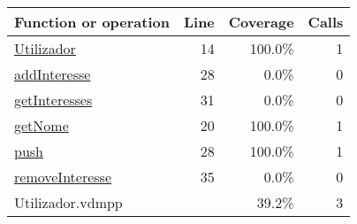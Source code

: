 \begin{longtable}{|l|r|r|r|}
\hline
Function or operation & Line & Coverage & Calls \\
\hline
\hline
\hyperref[Utilizador:14]{Utilizador} & 14&100.0\% & 1 \\
\hline
\hyperref[addInteresse:28]{addInteresse} & 28&0.0\% & 0 \\
\hline
\hyperref[getInteresses:31]{getInteresses} & 31&0.0\% & 0 \\
\hline
\hyperref[getNome:20]{getNome} & 20&100.0\% & 1 \\
\hline
\hyperref[push:28]{push} & 28&100.0\% & 1 \\
\hline
\hyperref[removeInteresse:35]{removeInteresse} & 35&0.0\% & 0 \\
\hline
\hline
Utilizador.vdmpp & & 39.2\% & 3 \\
\hline
\end{longtable}

